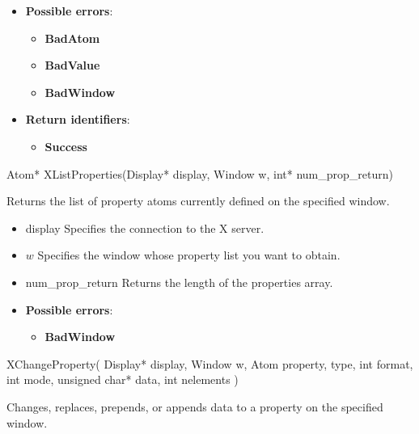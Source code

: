 \documentclass{report}
\begin{document}
\begin{itemize}
            \begin{itemize}
                \item \textbf{Possible errors}:
                    \begin{itemize}
                        \item \textbf{BadAtom}
                        \item \textbf{BadValue}
                        \item \textbf{BadWindow}
                    \end{itemize}
                \item \textbf{Return identifiers}:
                    \begin{itemize}
                        \item \textbf{Success}
                    \end{itemize}
            \end{itemize}

            \begin{cppcode}
            Atom* XListProperties(Display* display, Window w, int* num_prop_return)
            \end{cppcode}
            \bigbreak \noindent
            Returns the list of property atoms currently defined on the specified window.

            \begin{itemize}
                \item display Specifies the connection to the X server.
                \item $w$ Specifies the window whose property list you want to obtain.
                \item num\_prop\_return Returns the length of the properties array.
            \end{itemize}

            \begin{itemize}
                \item \textbf{Possible errors}:
                    \begin{itemize}
                        \item \textbf{BadWindow}
                    \end{itemize}
            \end{itemize}

            \begin{cppcode}
            XChangeProperty(
                Display* display,
                Window w,
                Atom property, type,
                int format,
                int mode,
                unsigned char* data,
                int nelements
            )
            \end{cppcode}
            \bigbreak \noindent
            Changes, replaces, prepends, or appends data to a property on the specified window.


\end{itemize}
\end{document}
